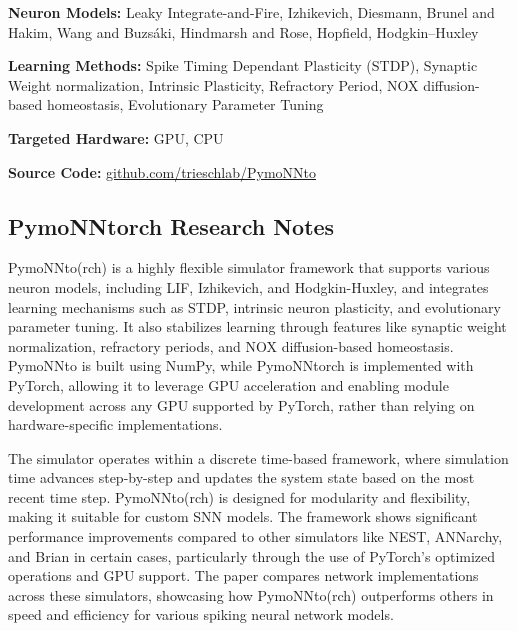 \begin{tcolorbox}[enhanced,attach boxed title to top center={yshift=-3mm,yshifttext=-1mm}, colback=blue!5!white,colframe=blue!75!black,colbacktitle=red!80!black, title=PymoNNto at a Glance,fonttitle=\bfseries, boxed title style={size=small,colframe=red!50!black} ]

\textbf{Neuron Models:} Leaky Integrate-and-Fire, Izhikevich, Diesmann, Brunel and Hakim, Wang and Buzsáki, Hindmarsh and Rose, Hopfield, Hodgkin–Huxley

\textbf{Learning Methods:} Spike Timing Dependant Plasticity (STDP), Synaptic Weight normalization, Intrinsic Plasticity, Refractory Period, NOX diffusion-based homeostasis, Evolutionary Parameter Tuning  

\textbf{Targeted Hardware:} GPU, CPU 

\textbf{Source Code:} \href{https://github.com/trieschlab/PymoNNto}{github.com/trieschlab/PymoNNto}
\end{tcolorbox}
\subsection*{PymoNNtorch Research Notes}\label{PymoNNtorch}

PymoNNto(rch) is a highly flexible simulator framework that supports various neuron models, including LIF, Izhikevich, and Hodgkin-Huxley, and integrates learning mechanisms such as STDP, intrinsic neuron plasticity, and evolutionary parameter tuning. It also stabilizes learning through features like synaptic weight normalization, refractory periods, and NOX diffusion-based homeostasis. PymoNNto is built using NumPy, while PymoNNtorch is implemented with PyTorch, allowing it to leverage GPU acceleration and enabling module development across any GPU supported by PyTorch, rather than relying on hardware-specific implementations.

The simulator operates within a discrete time-based framework, where simulation time advances step-by-step and updates the system state based on the most recent time step. PymoNNto(rch) is designed for modularity and flexibility, making it suitable for custom SNN models. The framework shows significant performance improvements compared to other simulators like NEST, ANNarchy, and Brian in certain cases, particularly through the use of PyTorch’s optimized operations and GPU support. The paper compares network implementations across these simulators, showcasing how PymoNNto(rch) outperforms others in speed and efficiency for various spiking neural network models.

